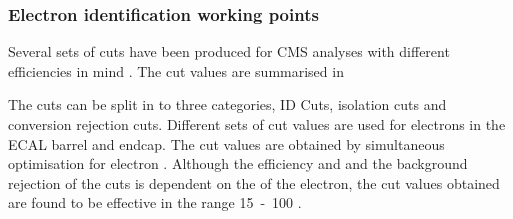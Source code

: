


\subsubsection{Electron identification working points}

Several sets of cuts have been produced for CMS analyses with different
efficiencies in mind \cite{nikos,daskalakis2009data}.
The cut values are summarised in 
\cite{twiki_electron}

The cuts can be split in to three categories, ID Cuts, isolation cuts and
conversion rejection cuts. Different sets of cut values are used for electrons in the
ECAL barrel and endcap. The cut values are obtained by simultaneous optimisation
for electron \unit{}{\GeV}. Although the efficiency and and the background
rejection of the cuts is dependent on the \ET of the electron, the cut values
obtained are found to be effective in the range \unit{15-100}{\GeV}
\cite{nikos,daskalakis2009data}.
